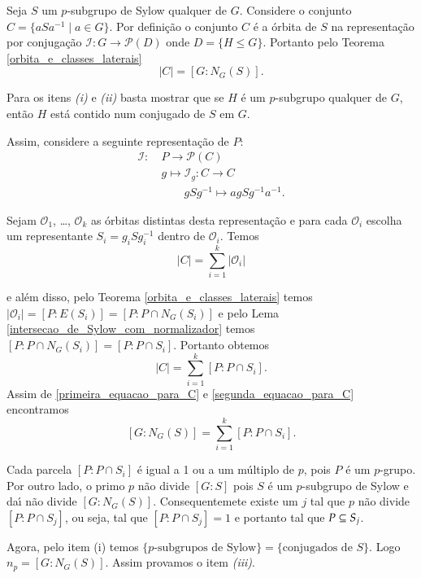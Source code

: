 \begin{prova}

	Seja $S$ um $p$-subgrupo de Sylow qualquer de $G$. Considere o conjunto $C = \{aSa^{-1} \mid a \in G\}$. Por defini\c{c}\~ao o conjunto $C$ \'e a \'orbita de $S$ na representa\c{c}\~ao por conjuga\c{c}\~ao $\mathcal{I} : G \to \mathcal{P}(D)$ onde $D = \{H \le G\}$. Portanto pelo Teorema \ref{orbita_e_classes_laterais}
	\[
		|C| = [G : N_G(S)].
	\]

	Para os itens \textit{(i)} e \textit{(ii)} basta mostrar que se $H$ \'e um $p$-subgrupo qualquer de $G$, ent\~ao $H$ est\'a contido num conjugado de $S$ em $G$.

	Assim, considere a seguinte representa\c{c}\~ao de $P$:
	\begin{align*}
		\mathcal{I}:\ &P \to \mathcal{P}(C)\\
		&g \mapsto \mathcal{I}_g : C \to C\\
		& \qquad gSg^{-1} \mapsto agSg^{-1}a^{-1}.
	\end{align*}

	Sejam $\mathcal{O}_1$, \dots, $\mathcal{O}_k$ as \'orbitas distintas desta representa\c{c}\~ao e para cada $\mathcal{O}_i$ escolha um representante $S_i = g_iSg_i^{-1}$ dentro de $\mathcal{O}_i$. Temos
	\begin{equation}\label{primeira_equacao_para_C}
		|C| = \sum_{i = 1}^k |\mathcal{O}_i|
	\end{equation}

	e al\'em disso, pelo Teorema \ref{orbita_e_classes_laterais} temos $|\mathcal{O}_i| = [P : E(S_i)] = [P : P \cap N_G(S_i)]$ e pelo Lema \ref{intersecao_de_Sylow_com_normalizador} temos $[P : P \cap N_G(S_i)] = [P : P \cap S_i]$. Portanto obtemos
	\begin{equation}\label{segunda_equacao_para_C}
		|C| = \sum_{i = 1}^k[P : P \cap S_i].
	\end{equation}
	Assim de \eqref{primeira_equacao_para_C} e \eqref{segunda_equacao_para_C} encontramos
	\begin{equation}\label{indice_do_normalizador}
		[G : N_G(S)] = \sum_{i = 1}^k[P : P \cap S_i].
	\end{equation}

	Cada parcela $[P : P \cap S_i]$ \'e igual a 1 ou a um m\'ultiplo de $p$, pois $P$ \'e um $p$-grupo. Por outro lado, o primo $p$ n\~ao divide $[G : S]$ pois $S$ \'e um $p$-subgrupo de Sylow e da{\'\i} n\~ao divide $[G : N_G(S)]$. Consequentemete existe um $j$ tal que $p$ n\~ao divide $[P : P \cap S_j]$, ou seja, tal que $[P : P \cap S_j] = 1$ e portanto tal que $P \subseteq S_j$.

	Agora, pelo item (i) temos $\{p\mbox{-subgrupos de Sylow}\} = \{\mbox{conjugados de } S\}$. Logo $n_p = [G : N_G(S)]$. Assim provamos o item \textit{(iii)}.
\end{prova}

